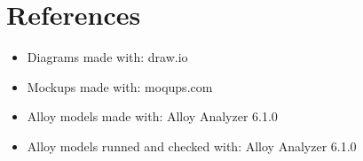 \section{References}

\begin{itemize}
    \item Diagrams made with: draw.io
    \item Mockups made with: moqups.com
    \item Alloy models made with: Alloy Analyzer 6.1.0
    \item Alloy models runned and checked with: Alloy Analyzer 6.1.0
\end{itemize}